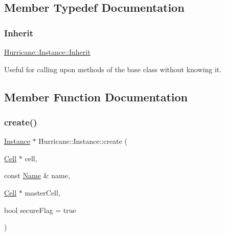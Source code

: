 \subsection{Member Typedef Documentation}
\mbox{\label{classHurricane_1_1Instance_a227e1f98670e466328ca95fe45546590}} 
\subsubsection{\texorpdfstring{Inherit}{Inherit}}
{\footnotesize\ttfamily \mbox{\hyperlink{classHurricane_1_1Instance_a227e1f98670e466328ca95fe45546590}{Hurricane\+::\+Instance\+::\+Inherit}}}

Useful for calling upon methods of the base class without knowing it. 

\subsection{Member Function Documentation}
\mbox{\label{classHurricane_1_1Instance_ae130b66536e4536ba8852fb79abfb89e}} 
\subsubsection{\texorpdfstring{create()}{create()}\hspace{0.1cm}{\footnotesize\ttfamily [1/2]}}
{\footnotesize\ttfamily \mbox{\hyperlink{classHurricane_1_1Instance}{Instance}} $\ast$ Hurricane\+::\+Instance\+::create (\begin{DoxyParamCaption}\item[{\mbox{\hyperlink{classHurricane_1_1Cell}{Cell}} $\ast$}]{cell,  }\item[{const \mbox{\hyperlink{classHurricane_1_1Name}{Name}} \&}]{name,  }\item[{\mbox{\hyperlink{classHurricane_1_1Cell}{Cell}} $\ast$}]{master\+Cell,  }\item[{bool}]{secure\+Flag = {\ttfamily true} }\end{DoxyParamCaption})\hspace{0.3cm}{\ttfamily [static]}}

